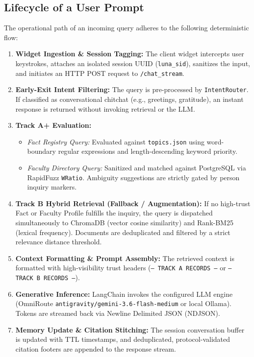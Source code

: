 \documentclass[11pt,a4paper]{article}
\begin{document}
\subsection{Lifecycle of a User Prompt}
The operational path of an incoming query adheres to the following deterministic flow:
\begin{enumerate}
    \item \textbf{Widget Ingestion \& Session Tagging:} The client widget intercepts user keystrokes, attaches an isolated session UUID (\texttt{luna\_sid}), sanitizes the input, and initiates an HTTP POST request to \texttt{/chat\_stream}.
    \item \textbf{Early-Exit Intent Filtering:} The query is pre-processed by \texttt{IntentRouter}. If classified as conversational chitchat (e.g., greetings, gratitude), an instant response is returned without invoking retrieval or the LLM.
    \item \textbf{Track A+ Evaluation:}
    \begin{itemize}
        \item \textit{Fact Registry Query:} Evaluated against \texttt{topics.json} using word-boundary regular expressions and length-descending keyword priority.
        \item \textit{Faculty Directory Query:} Sanitized and matched against PostgreSQL via RapidFuzz \texttt{WRatio}. Ambiguity suggestions are strictly gated by person inquiry markers.
    \end{itemize}
    \item \textbf{Track B Hybrid Retrieval (Fallback / Augmentation):} If no high-trust Fact or Faculty Profile fulfills the inquiry, the query is dispatched simultaneously to ChromaDB (vector cosine similarity) and Rank-BM25 (lexical frequency). Documents are deduplicated and filtered by a strict relevance distance threshold.
    \item \textbf{Context Formatting \& Prompt Assembly:} The retrieved context is formatted with high-visibility trust headers (\texttt{--- TRACK A RECORDS ---} or \texttt{--- TRACK B RECORDS ---}).
    \item \textbf{Generative Inference:} LangChain invokes the configured LLM engine (OmniRoute \texttt{antigravity/gemini-3.6-flash-medium} or local Ollama). Tokens are streamed back via Newline Delimited JSON (NDJSON).
    \item \textbf{Memory Update \& Citation Stitching:} The session conversation buffer is updated with TTL timestamps, and deduplicated, protocol-validated citation footers are appended to the response stream.
\end{enumerate}
\end{document}
